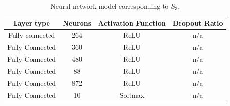\documentclass[preprint,12pt]{elsarticle}%
\begin{document}
\begin{table}[H]
\begin{center}
\caption{Neural network model corresponding to $S_3$.}
\label{table:neural_network_model_S3}
\vspace{12pt}
\begin{tabular}{| c | c | c | c |}
\hline
Layer type & Neurons & Activation Function & Dropout Ratio \\
\hline
Fully connected & 264 & ReLU & n/a \\
Fully Connected & 360 & ReLU & n/a\\
Fully Connected & 480 & ReLU & n/a\\
Fully Connected & 88 & ReLU & n/a\\
Fully Connected & 872 & ReLU & n/a\\
Fully Connected & 10 & Softmax & n/a\\
\hline
\end{tabular}
\end{center}
\end{table}

\pagebreak
\end{document}
